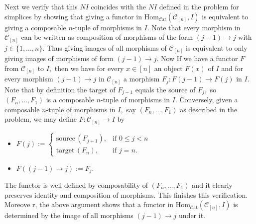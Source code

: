 \documentclass{article}
\newcommand\cat{\mathcal{C}\mathrm{at}}
\newcommand\C{\mathcal{C}}
\begin{document}
Next we verify that this $NI$ coincides with the $NI$ defined in the problem for simplices by showing that giving a functor in $\text{Hom}_{\cat}(\C_{[n]},I)$ is equivalent to giving a composable $n$-tuple of morphisms in $I.$ Note that every morphism in $\C_{[n]}$ can be written as composition of morphisms of the form $(j-1)\rightarrow j$ with $j\in\{1,\ldots,n\}.$ Thus giving images of all morphisms of $\C_{[n]}$ is equivalent to only giving images of morphisms of form $(j-1)\rightarrow j.$ Now If we have a functor $F$ from $\C_{[n]}$ to $I,$ then we have for every $x\in[n]$ an object $F(x)$ of $I$ and for every morphism $(j-1)\rightarrow j$ in $\C_{[n]}$ a morphism $F_j\colon F(j-1)\rightarrow F(j)$ in $I.$ Note that by definition the target of $F_{j-1}$ equals the source of $F_j,$ so $(F_n,\ldots,F_1)$ is a composable $n$-tuple of morphisms in $I.$ Conversely, given a composable $n$-tuple of morphisms in $I,$ say $(F_n,\ldots,F_1)$ as described in the problem, we may define $F\colon\C_{[n]}\rightarrow I$ by
\begin{itemize}
  \item $F(j):=\begin{cases}
                \text{source}\,(F_{j+1}), & \mbox{if } 0\leq j<n \\
                \text{target}\,(F_n), & \mbox{if } j=n.
              \end{cases}$
  \item $F((j-1)\rightarrow j):=F_j.$
\end{itemize}
The functor is well-defined by composability of $(F_n,\ldots,F_1)$ and it clearly preserves identity and composition of morphisms. This finishes this verification. Moreove r, the above argument shows that a functor in $\text{Hom}_{\cat}(\C_{[n]},I)$ is determined by the image of all morphisms $(j-1)\rightarrow j$ under it.
\end{document}

